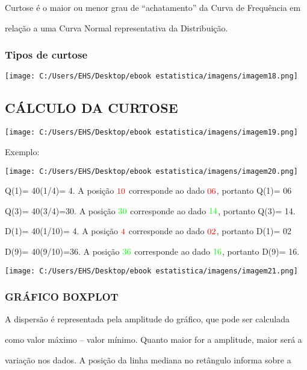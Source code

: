 \documentclass[]{book}
\begin{document}
Curtose é o maior ou menor grau de ``achatamento'' da Curva de Frequência em

relação a uma Curva Normal representativa da Distribuição.

\hypertarget{tipos-de-curtose}{%
\subsubsection{Tipos de curtose}\label{tipos-de-curtose}}

\texttt{[image: C:/Users/EHS/Desktop/ebook estatistica/imagens/imagem18.png]}

\hypertarget{calculo-da-curtose}{%
\subsection{CÁLCULO DA CURTOSE}\label{calculo-da-curtose}}

\texttt{[image: C:/Users/EHS/Desktop/ebook estatistica/imagens/imagem19.png]}

Exemplo:

\texttt{[image: C:/Users/EHS/Desktop/ebook estatistica/imagens/imagem20.png]}

Q(1)= 40(1/4)= 4. A posição \(\color{red}{\text{10}}\) corresponde ao dado \(\color{red}{\text{06}}\), portanto Q(1)= 06

Q(3)= 40(3/4)=30. A posição \(\color{green}{\text{30}}\) corresponde ao dado \(\color{green}{\text{14}}\), portanto Q(3)= 14.

D(1)= 40(1/10)= 4. A posição \(\color{red}{\text{4}}\) corresponde ao dado \(\color{red}{\text{02}}\), portanto D(1)= 02

D(9)= 40(9/10)=36. A posição \(\color{green}{\text{36}}\) corresponde ao dado \(\color{green}{\text{16}}\), portanto D(9)= 16.

\texttt{[image: C:/Users/EHS/Desktop/ebook estatistica/imagens/imagem21.png]}

\hypertarget{grafico-boxplot}{%
\subsubsection{GRÁFICO BOXPLOT}\label{grafico-boxplot}}

A dispersão é representada pela amplitude do gráfico, que pode ser calculada

como valor máximo -- valor mínimo. Quanto maior for a amplitude, maior será a

variação nos dados. A posição da linha mediana no retângulo informa sobre a
\end{document}
